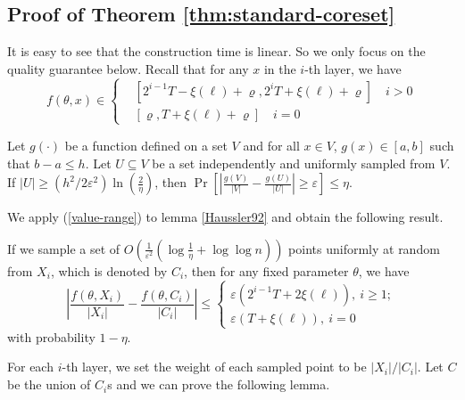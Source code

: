 \subsection{Proof of Theorem \ref{thm:standard-coreset}}
\label{sec-appthestancoreset}
It is easy to see that the construction time is linear. So we only focus on the quality guarantee below. Recall that for any $ x $ in the $ i $-th layer, we have
\begin{equation}\label{value-range}
	f(\theta,x)\in\begin{cases}
		&[2^{i-1}T-\xi(\ell)+\varrho,2^iT+\xi(\ell)+\varrho] \quad i>0 \\
		&[\varrho,T+\xi(\ell)+\varrho]\quad i=0
	\end{cases}
\end{equation}
\begin{lemma}\label{Haussler92}
	Let $ g(\cdot) $ be a function defined on a set $ V $ and for all $ x\in V $, $ g(x)\in [a,b] $ such that $ b-a\leq h $. Let $ U\subseteq V $ be a set independently and uniformly sampled from $ V $. If $ |U|\geq (h^2/2\varepsilon^2)\ln(\frac{2}{\eta}) $, then $ \Pr\left[\left| \frac{g(V)}{|V|}-\frac{g(U)}{|U|} \right|\geq \varepsilon \right]\leq \eta $. 
\end{lemma}
We apply  (\ref{value-range}) to lemma \ref{Haussler92} and obtain the following result. 
\begin{lemma}
	If we sample a set of $ O\left(\frac{1}{\varepsilon^2}\left(\log\frac{1}{\eta}+\log\log n \right)\right) $ points uniformly at random from $ X_i $, which is denoted by $ C_i $, then for any fixed parameter $ \theta $, we have
	\begin{equation}\label{1layer-1}
		\left| \frac{f(\theta,X_i)}{|X_i|}-\frac{f(\theta,C_i)}{|C_i|} \right|\leq
		\begin{cases}
			\varepsilon(2^{i-1}T+2\xi(\ell)), \ i\geq 1; \\ \varepsilon(T+\xi(\ell)),  \ i=0 
		\end{cases}
	\end{equation}
	with probability $ 1-\eta $.
\end{lemma}
For each $i$-th layer, we set the weight of each sampled point  to be $|X_i|/|C_i|$. Let $ C $ be the union of $ C_i $s and we can prove the following lemma.


